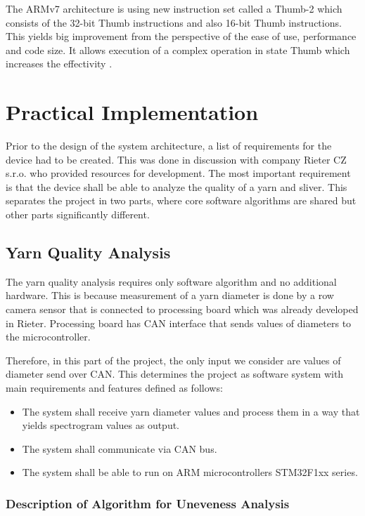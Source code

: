 \documentclass[twoside]{ctuthesis}
\theoremstyle{plain}
\theoremstyle{definition}
\theoremstyle{note}
\begin{document}
The ARMv7 architecture is using new instruction set called a Thumb-2 which consists of the 32-bit Thumb instructions and also 16-bit Thumb instructions. This yields big improvement from the perspective of the ease of use, performance and code size. It allows execution of a complex operation in state Thumb which increases the effectivity \cite{cite:ARM-M3}.

\chapter{Practical Implementation}
Prior to the design of the system architecture, a list of requirements for the device had to be created. This was done in discussion with company Rieter CZ s.r.o. who provided resources for development. The most important requirement is that the device shall be able to analyze the quality of a yarn and sliver. This separates the project in two parts, where core software algorithms are shared but other parts significantly different. 

\section{Yarn Quality Analysis}
The yarn quality analysis requires only software algorithm and no additional hardware. This is because measurement of a yarn diameter is done by a row camera sensor that is connected to processing board which was already developed in Rieter. Processing board has CAN interface that sends values of diameters to the microcontroller. 

Therefore, in this part of the project, the only input we consider are values of diameter send over CAN. This determines the project as software system with main requirements and features defined as follows:
\begin{itemize}
 	\setlength{\itemsep}{5pt}
 	\item The system shall receive yarn diameter values and process them in a way that yields spectrogram values as output.
 	\item The system shall communicate via CAN bus.
 	\item The system shall be able to run on ARM microcontrollers STM32F1xx series.
\end{itemize}

\subsection{Description of Algorithm for Uneveness Analysis}
\end{document}
